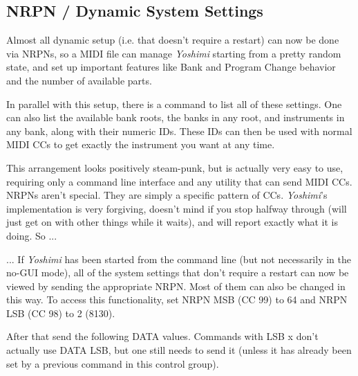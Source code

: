 \subsection{NRPN / Dynamic System Settings}
\label{subsection:nrpns_dynamic_system_settings}

   Almost all dynamic setup (i.e. that doesn't require a restart) can now be
   done via NRPNs, so a MIDI file can manage \textsl{Yoshimi} starting from a
   pretty random state, and set up important features like Bank and Program
   Change behavior and the number of available parts.

   In parallel with this setup, there is a command to list all of these
   settings. One can also list the available bank roots, the banks in any
   root, and instruments in any bank, along with their numeric IDs. These IDs
   can then be used with normal MIDI CCs to get exactly the instrument you
   want at any time.

   This arrangement looks positively steam-punk, but is actually very easy to
   use, requiring only a command line interface and any utility that can send
   MIDI CCs. NRPNs aren't special. They are simply a specific pattern of CCs.
   \textsl{Yoshimi}'s implementation is very forgiving, doesn't mind if you
   stop halfway through (will just get on with other things while it waits),
   and will report exactly what it is doing.  So ...

   ... If \textsl{Yoshimi} has been started from the command line (but not
   necessarily in the no-GUI mode), all of the system settings that don't
   require a restart can now be viewed by sending the appropriate NRPN. Most
   of them can also be changed in this way.
   To access this functionality, set NRPN MSB (CC 99) to 64 and NRPN LSB (CC
   98) to 2 (8130).

   After that send the following DATA values. Commands with LSB x don't
   actually use DATA LSB, but one still needs to send it (unless it has
   already been set by a previous command in this control group).

